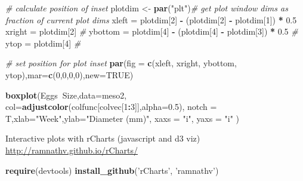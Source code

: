 \documentclass[10,portrait]{article}
\newenvironment{Shaded}{\begin{snugshade}}{\end{snugshade}}
\newcommand{\KeywordTok}[1]{\textcolor[rgb]{0.13,0.29,0.53}{\textbf{#1}}}
\newcommand{\DataTypeTok}[1]{\textcolor[rgb]{0.13,0.29,0.53}{#1}}
\newcommand{\DecValTok}[1]{\textcolor[rgb]{0.00,0.00,0.81}{#1}}
\newcommand{\FloatTok}[1]{\textcolor[rgb]{0.00,0.00,0.81}{#1}}
\newcommand{\StringTok}[1]{\textcolor[rgb]{0.31,0.60,0.02}{#1}}
\newcommand{\CommentTok}[1]{\textcolor[rgb]{0.56,0.35,0.01}{\textit{#1}}}
\newcommand{\OtherTok}[1]{\textcolor[rgb]{0.56,0.35,0.01}{#1}}
\newcommand{\OperatorTok}[1]{\textcolor[rgb]{0.81,0.36,0.00}{\textbf{#1}}}
\newcommand{\NormalTok}[1]{#1}
\begin{document}
\begin{Shaded}
\begin{Highlighting}[]
\CommentTok{# calculate position of inset}
\NormalTok{plotdim <-}\StringTok{ }\KeywordTok{par}\NormalTok{(}\StringTok{"plt"}\NormalTok{)}\CommentTok{# get plot window dims as fraction of current plot dims }
\NormalTok{xleft    =}\StringTok{ }\NormalTok{plotdim[}\DecValTok{2}\NormalTok{] }\OperatorTok{-}\StringTok{ }\NormalTok{(plotdim[}\DecValTok{2}\NormalTok{] }\OperatorTok{-}\StringTok{ }\NormalTok{plotdim[}\DecValTok{1}\NormalTok{]) }\OperatorTok{*}\StringTok{ }\FloatTok{0.5}
\NormalTok{xright   =}\StringTok{ }\NormalTok{plotdim[}\DecValTok{2}\NormalTok{]  }\CommentTok{#}
\NormalTok{ybottom  =}\StringTok{ }\NormalTok{plotdim[}\DecValTok{4}\NormalTok{] }\OperatorTok{-}\StringTok{ }\NormalTok{(plotdim[}\DecValTok{4}\NormalTok{] }\OperatorTok{-}\StringTok{ }\NormalTok{plotdim[}\DecValTok{3}\NormalTok{]) }\OperatorTok{*}\StringTok{ }\FloatTok{0.5}  \CommentTok{#}
\NormalTok{ytop     =}\StringTok{ }\NormalTok{plotdim[}\DecValTok{4}\NormalTok{]  }\CommentTok{#}

\CommentTok{# set position for plot inset}
\KeywordTok{par}\NormalTok{(}\DataTypeTok{fig =} \KeywordTok{c}\NormalTok{(xleft, xright, ybottom, ytop),}\DataTypeTok{mar=}\KeywordTok{c}\NormalTok{(}\DecValTok{0}\NormalTok{,}\DecValTok{0}\NormalTok{,}\DecValTok{0}\NormalTok{,}\DecValTok{0}\NormalTok{),}\DataTypeTok{new=}\OtherTok{TRUE}\NormalTok{)}

\KeywordTok{boxplot}\NormalTok{(Eggs}\OperatorTok{~}\NormalTok{Size,}\DataTypeTok{data=}\NormalTok{meso2,}
                \DataTypeTok{col=}\KeywordTok{adjustcolor}\NormalTok{(colfunc[colvec[}\DecValTok{1}\OperatorTok{:}\DecValTok{3}\NormalTok{]],}\DataTypeTok{alpha=}\FloatTok{0.5}\NormalTok{),}
                \DataTypeTok{notch =}\NormalTok{ T,}\DataTypeTok{xlab=}\StringTok{"Week"}\NormalTok{,}\DataTypeTok{ylab=}\StringTok{"Diameter (mm)"}\NormalTok{,}
                \DataTypeTok{xaxs =} \StringTok{"i"}\NormalTok{, }\DataTypeTok{yaxs =} \StringTok{"i"}
\NormalTok{                ) }
\end{Highlighting}
\end{Shaded}

Interactive plots with rCharts (javascript and d3 viz)\\
\url{http://ramnathv.github.io/rCharts/}

\begin{Shaded}
\begin{Highlighting}[]
\KeywordTok{require}\NormalTok{(devtools)}
\KeywordTok{install_github}\NormalTok{(}\StringTok{'rCharts'}\NormalTok{, }\StringTok{'ramnathv'}\NormalTok{)}
\end{Highlighting}
\end{Shaded}
\end{document}
